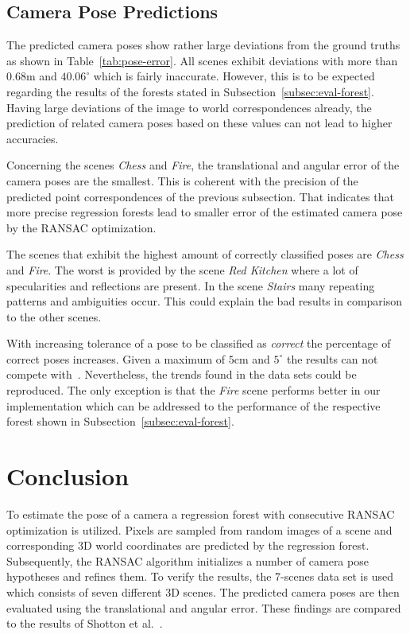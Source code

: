 \documentclass[final]{cvpr}
\begin{document}
\subsection{Camera Pose Predictions}
The predicted camera poses show rather large deviations from the ground truths as shown in Table~\ref{tab:pose-error}.
All scenes exhibit deviations with more than $0.68$m and $40.06^\circ$ which is fairly inaccurate. However, this is
to be expected regarding the results of the forests stated in Subsection~\ref{subsec:eval-forest}. Having large deviations 
of the image to world correspondences already, the prediction of related camera poses based on these values can not lead
to higher accuracies. 

Concerning the scenes \textit{Chess} and \textit{Fire}, the translational and angular error of the camera poses 
are the smallest. 
This is coherent with the precision of the predicted point correspondences of the previous subsection. 
That indicates that more precise regression forests lead to smaller error of the estimated camera pose 
by the RANSAC optimization. 

The scenes that exhibit the highest amount of correctly classified poses are \textit{Chess} and \textit{Fire}. 
The worst is provided by the scene \textit{Red Kitchen} where a lot of specularities and reflections are 
present. In the scene \textit{Stairs} many repeating patterns and ambiguities occur. This could explain the bad results 
in comparison to the other scenes.

With increasing tolerance of a pose to be classified as \textit{correct} the percentage of correct poses increases. 
Given a maximum of $5$cm and $5^\circ$ the results can not compete with~\cite{shotton2013}. Nevertheless, the trends found in 
the data sets could be reproduced. The only exception is that the \textit{Fire} scene performs better in our implementation 
which can be addressed to the performance of the respective forest shown in Subsection~\ref{subsec:eval-forest}.


\section{Conclusion}
To estimate the pose of a camera a regression forest with consecutive RANSAC optimization is utilized. Pixels are sampled from
random images of a scene and corresponding 3D world coordinates are predicted by the regression forest. Subsequently, 
the RANSAC algorithm initializes a number of camera pose hypotheses and refines them. To verify the results, the 7-scenes data 
set is used which consists of seven different 3D scenes. The predicted camera poses are then evaluated
using the translational and angular error. These findings are compared to the results of Shotton et 
al.~\cite{shotton2013}. 
\end{document}
